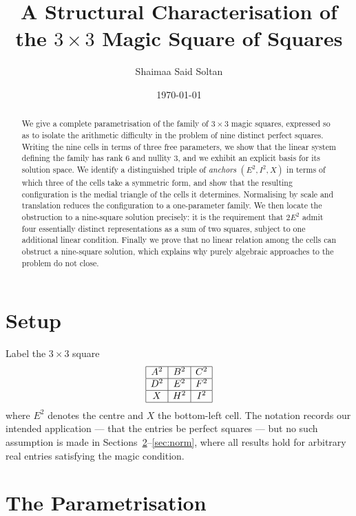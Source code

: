 \documentclass[12pt]{article}
\title{A Structural Characterisation of the $3\times3$ Magic Square of Squares}
\author{Shaimaa Said Soltan}
\date{\today}
\theoremstyle{remark}
\begin{document}
\maketitle

\begin{abstract}
We give a complete parametrisation of the family of $3\times3$ magic
squares, expressed so as to isolate the arithmetic difficulty in the
problem of nine distinct perfect squares. Writing the nine cells in
terms of three free parameters, we show that the linear system defining
the family has rank $6$ and nullity $3$, and we exhibit an explicit
basis for its solution space. We identify a distinguished triple of
\emph{anchors} $(E^2, I^2, X)$ in terms of which three of the cells take
a symmetric form, and show that the resulting configuration is the
medial triangle of the cells it determines. Normalising by scale and
translation reduces the configuration to a one-parameter family. We
then locate the obstruction to a nine-square solution precisely: it is
the requirement that $2E^2$ admit four essentially distinct
representations as a sum of two squares, subject to one additional
linear condition. Finally we prove that no linear relation among the
cells can obstruct a nine-square solution, which explains why purely
algebraic approaches to the problem do not close.
\end{abstract}

\section{Setup}

Label the $3\times3$ square
\[
\begin{array}{|c|c|c|}
\hline
A^2 & B^2 & C^2 \\ \hline
D^2 & E^2 & F^2 \\ \hline
X   & H^2 & I^2 \\ \hline
\end{array}
\]
where $E^2$ denotes the centre and $X$ the bottom-left cell. The
notation records our intended application --- that the entries be
perfect squares --- but no such assumption is made in
Sections~\ref{sec:param}--\ref{sec:norm}, where all results hold for
arbitrary real entries satisfying the magic condition.

\section{The Parametrisation}\label{sec:param}
\end{document}

